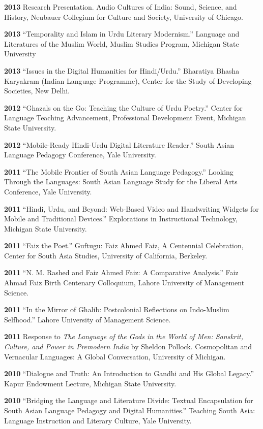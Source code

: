 \documentclass[letterpaper,12pt]{article}
\begin{document}
\textbf{2013}
Research Presentation.
Audio Cultures of India: Sound, Science, and History,
Neubauer Collegium for Culture and Society, University of Chicago.

\textbf{2013}
“Temporality and Islam in Urdu Literary Modernism.”
Language and Literatures of the Muslim World,
Muslim Studies Program,
Michigan State University

\textbf{2013}
“Issues in the Digital Humanities for Hindi/Urdu.”
Bharatiya Bhasha Karyakram (Indian Language Programme),
Center for the Study of Developing Societies, New Delhi.

\textbf{2012}
“Ghazals on the Go: Teaching the Culture of Urdu Poetry.”
Center for Language Teaching Advancement,
Professional Development Event,
Michigan State University.

\textbf{2012}
“Mobile-Ready Hindi-Urdu Digital Literature Reader.”
South Asian Language Pedagogy Conference, Yale University.

\textbf{2011}
“The Mobile Frontier of South Asian Language Pedagogy.”
Looking Through the Languages:
South Asian Language Study for the Liberal Arts Conference,
Yale University.

\textbf{2011}
“Hindi, Urdu, and Beyond:
Web-Based Video and Handwriting Widgets for Mobile and Traditional Devices.”
Explorations in Instructional Technology, Michigan State University.

\textbf{2011}
“Faiz the Poet.”
Guftugu: Faiz Ahmed Faiz, A Centennial Celebration,
Center for South Asia Studies, University of California, Berkeley.

\textbf{2011}
“N. M. Rashed and Faiz Ahmed Faiz: A Comparative Analysis.”
Faiz Ahmad Faiz Birth Centenary Colloquium,
Lahore University of Management Science.

\textbf{2011}
“In the Mirror of Ghalib: Postcolonial Reflections on Indo-Muslim Selfhood.”
Lahore University of Management Science.

\textbf{2011}
Response to \emph{The Language of the Gods in the World of Men:
Sanskrit, Culture, and Power in Premodern India} by Sheldon Pollock.
Cosmopolitan and Vernacular Languages: A Global Conversation, University of Michigan.

\textbf{2010}
“Dialogue and Truth: An Introduction to Gandhi and His Global Legacy.”
Kapur Endowment Lecture, Michigan State University.

\textbf{2010}
“Bridging the Language and Literature Divide:
Textual Encapsulation for South Asian Language Pedagogy and Digital Humanities.”
Teaching South Asia: Language Instruction and Literary Culture, Yale University.
\end{document}
